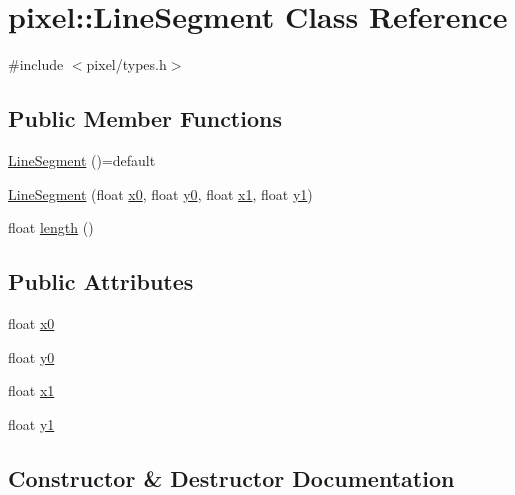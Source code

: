 \hypertarget{classpixel_1_1_line_segment}{}\section{pixel\+:\+:Line\+Segment Class Reference}
\label{classpixel_1_1_line_segment}


{\ttfamily \#include $<$pixel/types.\+h$>$}

\subsection*{Public Member Functions}
\begin{DoxyCompactItemize}
\item 
\hyperlink{classpixel_1_1_line_segment_a0ad3d24c8192c89774e7caf277168d39}{Line\+Segment} ()=default
\item 
\hyperlink{classpixel_1_1_line_segment_a908ff0ace1fa46fa4ddc23d0f4413b18}{Line\+Segment} (float \hyperlink{classpixel_1_1_line_segment_a8471e97168d448505467cd0049131f1e}{x0}, float \hyperlink{classpixel_1_1_line_segment_a2d293acfc87ca0d41cb4926482160b6e}{y0}, float \hyperlink{classpixel_1_1_line_segment_a24f7b4c5d7ed1c256e852260beac619d}{x1}, float \hyperlink{classpixel_1_1_line_segment_ac28bac5789bed7818e6500378e16d97f}{y1})
\item 
float \hyperlink{classpixel_1_1_line_segment_ad3bac4aae966e09f98586c47f70dee44}{length} ()
\end{DoxyCompactItemize}
\subsection*{Public Attributes}
\begin{DoxyCompactItemize}
\item 
float \hyperlink{classpixel_1_1_line_segment_a8471e97168d448505467cd0049131f1e}{x0}
\item 
float \hyperlink{classpixel_1_1_line_segment_a2d293acfc87ca0d41cb4926482160b6e}{y0}
\item 
float \hyperlink{classpixel_1_1_line_segment_a24f7b4c5d7ed1c256e852260beac619d}{x1}
\item 
float \hyperlink{classpixel_1_1_line_segment_ac28bac5789bed7818e6500378e16d97f}{y1}
\end{DoxyCompactItemize}


\subsection{Constructor \& Destructor Documentation}
\mbox{\label{classpixel_1_1_line_segment_a0ad3d24c8192c89774e7caf277168d39}} 
